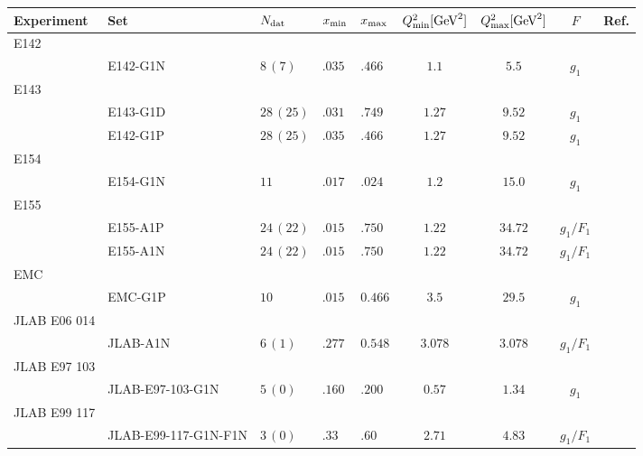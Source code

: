 \begin{tabularx}{1\pdfpagewidth}{llXXXcccc}
  \toprule \toprule
   Experiment    & Set  &  $N_{\textrm{dat}}$  &  $x_{\textrm{min}}$  &  $x_{\textrm{max}}$  & $Q^2_{\textrm{min}} [\textrm{GeV}^2]$ &  $Q^2_{\textrm{max}} [\textrm{GeV}^2]$ &    $F$    &  Ref. \\
  \midrule
   E142 
        \\       & E142-G1N & $8\,(7)$ & $.035$ & $.466$ & $1.1$ & $5.5$ & $g_1$ & \cite{E142:1993hql} \\
  \midrule
   E143 
        \\       &  E143-G1D  &   $28\,(25)$  &    $.031$       &      $.749$     &    $1.27$                   &       $9.52$                 &  $g_1$    & \cite{E143:1998hbs} \\       
                 &  E142-G1P  &   $28\,(25)$  &    $.035$       &      $.466$     &    $1.27$                   &       $9.52$                 &  $g_1$    & \cite{E143:1998hbs} \\
  \midrule
   E154 
        \\       &  E154-G1N  &   $11$         &    $.017$      &      $.024$      &   $ 1.2$                    & $15.0$                       & $g_1$     & \cite{E154:1997xfa} \\
  \midrule
   E155 
       \\        & E155-A1P   & $24\,(22)$      & $.015$        & $.750$          &  $1.22$                & $34.72$                & $g_1/F_1$          & \cite{E155:2000qdr}
       \\        & E155-A1N   & $24\,(22)$      & $.015$        & $.750$          &  $1.22$                & $34.72$                & $g_1/F_1$          & \cite{E155:2000qdr} \\
  \midrule
   EMC 
       \\        & EMC-G1P    & $10$         & $.015$       & $0.466$       &    $3.5$         & $29.5$                      & $g_1$          & \cite{EuropeanMuon:1989yki} \\
  \midrule
   JLAB E06 014
       \\        & JLAB-A1N   & $6\,(1)$     & $.277$       & $0.548$      & $3.078$    & $3.078$                  & $g_1/F_1$  & \cite{JeffersonLabHallA:2016neg} \\
  \midrule
   JLAB E97 103
       \\        & JLAB-E97-103-G1N & $5\,(0)$ & $.160$ & $.200$ & $0.57$ & $1.34$ & $g_1$ & \cite{Kramer:2002tt}\\
  \midrule
   JLAB E99 117 
       \\        & JLAB-E99-117-G1N-F1N & $3\,(0)$ & $.33$ & $.60$ & $2.71$ & $4.83$ & $g_1/F_1$ & \cite{JeffersonLabHallA:2004tea} \\

\end{tabularx}
